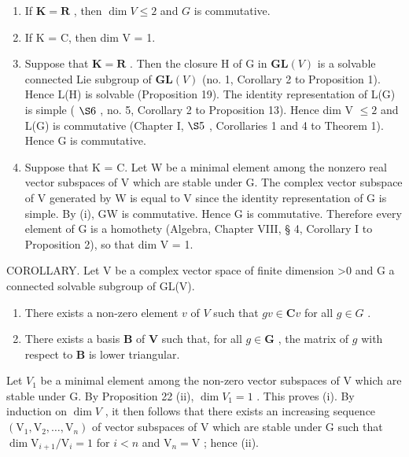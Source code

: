 \begin{enumerate}
\def\labelenumi{(\roman{enumi})}
\item
  If \(\mathbf{K} = \mathbf{R}\) , then \(\dim V \leqslant 2\) and \(G\) is commutative.
\item
  If K = C, then dim V = 1.
\item
  Suppose that \(\mathbf{K} = \mathbf{R}\) . Then the closure H of G in \(\mathbf{GL}(V)\) is a solvable connected Lie subgroup of \(\mathbf{GL}(V)\) (no. 1, Corollary 2 to Proposition 1). Hence L(H) is solvable (Proposition 19). The identity representation of L(G) is simple ( \(\S 6\) , no. 5, Corollary 2 to Proposition 13). Hence dim V \(\leqslant 2\) and L(G) is commutative (Chapter I, \(\S 5\) , Corollaries 1 and 4 to Theorem 1). Hence G is commutative.
\item
  Suppose that K = C. Let W be a minimal element among the nonzero real vector subspaces of V which are stable under G. The complex vector subspace of V generated by W is equal to V since the identity representation of G is simple. By (i), G\textbar W is commutative. Hence G is commutative. Therefore every element of G is a homothety (Algebra, Chapter VIII, § 4, Corollary I to Proposition 2), so that dim V = 1.
\end{enumerate}

COROLLARY. Let V be a complex vector space of finite dimension \textgreater0 and G a connected solvable subgroup of GL(V).

\begin{enumerate}
\def\labelenumi{(\roman{enumi})}
\item
  There exists a non-zero element \(v\) of \(V\) such that \(gv \in \mathbf{C}v\) for all \(g \in G\) .
\item
  There exists a basis \(\mathbf{B}\) of \(\mathbf{V}\) such that, for all \(g \in \mathbf{G}\) , the matrix of \(g\) with respect to \(\mathbf{B}\) is lower triangular.
\end{enumerate}

Let \(V_{1}\) be a minimal element among the non-zero vector subspaces of V which are stable under G. By Proposition 22 (ii), \(\dim V_{1} = 1\) . This proves (i). By induction on \(\dim V\) , it then follows that there exists an increasing sequence \((\mathrm{V}_1, \mathrm{V}_2, \ldots, \mathrm{V}_n)\) of vector subspaces of V which are stable under G such that \(\dim \mathrm{V}_{i+1} / \mathrm{V}_i = 1\) for \(i < n\) and \(\mathrm{V}_n = \mathrm{V}\) ; hence (ii).

